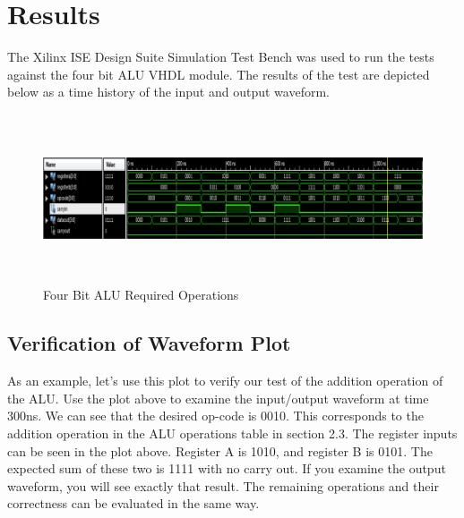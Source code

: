 \documentclass{article}
\begin{document}

\section{Results}
The Xilinx ISE Design Suite Simulation Test Bench was used to run the tests against the
four bit ALU VHDL module. The results of the test are depicted below as a time history
of the input and output waveform.

\label{definitions}

\begin{figure}[ht!]
\centering
\includegraphics[width=122mm, height=50mm]{images/ALUResults.png}
\caption{Four Bit ALU Required Operations} 
\label{overflow}
\end{figure}

\subsection{Verification of Waveform Plot}
As an example, let's use this plot to verify our test of the addition operation of the
ALU. Use the plot above to examine the input/output waveform at time 300ns. We can see
that the desired op-code is 0010. This corresponds to the addition operation in the ALU
operations table in section 2.3. The register inputs can be seen in the plot above.
Register A is 1010, and register B is 0101. The expected sum of these two is 1111 with 
no carry out. If you examine the output waveform, you will see exactly that result. The
remaining operations and their correctness can be evaluated in the same way.

\end{document}
